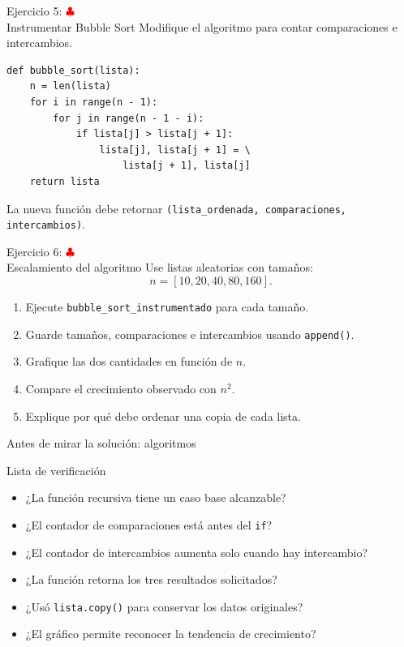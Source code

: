 \documentclass[10pt]{beamer}
\begin{document}
\begin{frame}[fragile]{Ejercicio 5: \hfill \textcolor{red}{$\clubsuit$} \\ Instrumentar Bubble Sort}
  Modifique el algoritmo para contar comparaciones e intercambios.

\begin{verbatim}
def bubble_sort(lista):
    n = len(lista)
    for i in range(n - 1):
        for j in range(n - 1 - i):
            if lista[j] > lista[j + 1]:
                lista[j], lista[j + 1] = \
                    lista[j + 1], lista[j]
    return lista
\end{verbatim}

  La nueva función debe retornar
  \texttt{(lista\_ordenada, comparaciones, intercambios)}.
\end{frame}

\begin{frame}{Ejercicio 6: \hfill \textcolor{red}{$\clubsuit$} \\ Escalamiento del algoritmo}
  Use listas aleatorias con tamaños:
  \[
    n=[10,20,40,80,160].
  \]

  \begin{enumerate}
    \item Ejecute \texttt{bubble\_sort\_instrumentado} para cada tamaño.
    \item Guarde tamaños, comparaciones e intercambios usando \texttt{append()}.
    \item Grafique las dos cantidades en función de \(n\).
    \item Compare el crecimiento observado con \(n^2\).
    \item Explique por qué debe ordenar una copia de cada lista.
  \end{enumerate}
\end{frame}

\begin{frame}{Antes de mirar la solución: algoritmos}
  \begin{block}{Lista de verificación}
    \begin{itemize}
      \item ¿La función recursiva tiene un caso base alcanzable?
      \item ¿El contador de comparaciones está antes del \texttt{if}?
      \item ¿El contador de intercambios aumenta solo cuando hay intercambio?
      \item ¿La función retorna los tres resultados solicitados?
      \item ¿Usó \texttt{lista.copy()} para conservar los datos originales?
      \item ¿El gráfico permite reconocer la tendencia de crecimiento?
    \end{itemize}
  \end{block}
\end{frame}
\end{document}
